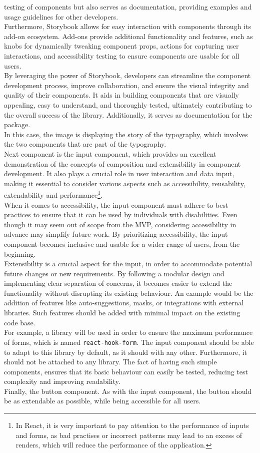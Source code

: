 \documentclass[./memory.tex]{subfiles}
\begin{document}
testing of components but also serves as documentation, providing examples and
usage guidelines for other developers.
\\
Furthermore, Storybook allows for easy interaction with components through its
add-on ecosystem. Add-ons provide additional functionality and features, such as
knobs for dynamically tweaking component props, actions for capturing user
interactions, and accessibility testing to ensure components are usable for all
users.
\\
By leveraging the power of Storybook, developers can streamline the component
development process, improve collaboration, and ensure the visual integrity and
quality of their components. It aids in building components that are visually
appealing, easy to understand, and thoroughly tested, ultimately contributing to
the overall success of the library. Additionally, it serves as documentation for
the package.
\\[8pt]
In this case, the image is displaying the story of the typography, which
involves the two components that are part of the typography.
\\[8pt]
Next component is the input component, which provides an excellent demonstration
of the concepts of composition and extensibility in component development. It
also plays a crucial role in user interaction and data input, making it
essential to consider various aspects such as accessibility, reusability,
extendability and performance\footnote{In React, it is very important to pay
	attention to the performance of inputs and forms, as bad practises or incorrect
	patterns may lead to an excess of renders, which will reduce the performance of
	the application.}.
\\
When it comes to accessibility, the input component must adhere to best
practices to ensure that it can be used by individuals with disabilities. Even
though it may seem out of scope from the MVP, considering accessibility in
advance may simplify future work. By prioritizing accessibility, the input
component becomes inclusive and usable for a wider range of users, from the
beginning.
\\
Extensibility is a crucial aspect for the input, in order to accommodate
potential future changes or new requirements. By following a modular design and
implementing clear separation of concerns, it becomes easier to extend the
functionality without disrupting its existing behaviour. An example would be the
addition of features like auto-suggestions, masks, or integrations with external
libraries. Such features should be added with minimal impact on the existing
code base.
\\
For example, a library will be used in order to ensure the maximum performance
of forms, which is named \texttt{react-hook-form}. The input component should be
able to adapt to this library by default, as it should with any other.
Furthermore, it should not be attached to any library. The fact of having such
simple components, ensures that its basic behaviour can easily be tested,
reducing test complexity and improving readability.
\\[8pt]
Finally, the button component. As with the input component, the button should be
as extendable as possible, while being accessible for all users.
\end{document}
